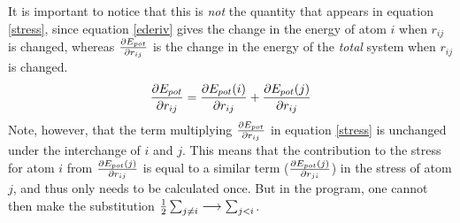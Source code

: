 \documentclass[a4paper,12pt]{article}
\begin{document}
It is important to notice that this is \emph{not} the quantity that
appears in equation \ref{stress}, since equation \ref{ederiv} gives
the change in the energy of atom $i$ when $r_{ij}$ is changed, whereas
${\partial E_{pot} \over \partial r_{ij}}$ is the change in the
energy of the \emph{total} system when $r_{ij}$ is changed.
\begin{equation}
  {\partial E_{pot} \over \partial r_{ij}} = {\partial E_{pot}(i) \over
    \partial r_{ij}} + {\partial E_{pot}(j) \over \partial r_{ij}}
\end{equation}
Note, however, that the term multiplying ${\partial E_{pot} \over
  \partial r_{ij}}$ in equation \ref{stress} is unchanged under the
interchange of $i$ and $j$.  This means that the contribution to the
stress for atom $i$ from ${\partial E_{pot}(j) \over \partial r_{ij}}$
is equal to a similar term (${\partial E_{pot}(j) \over \partial
  r_{ji}}$) in the stress of atom $j$, and thus only needs to be
calculated once.  But in the program, one cannot then make the
substitution ${1 \over 2} \sum_{j \neq i} \longrightarrow \sum_{j < i}$.
  
\end{document}
